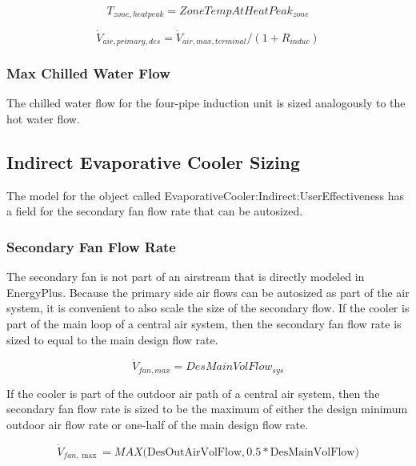 \begin{equation}
{T_{zone,heatpeak}} = ZoneTempAtHeatPea{k_{zone}}
\end{equation}

\begin{equation}
{\dot V_{air,primary,des}} = {\dot V_{air,max,terminal}}/(1 + {R_{induc}})
\end{equation}

\subsubsection{Max Chilled Water Flow}\label{max-chilled-water-flow}

The chilled water flow for the four-pipe induction unit is sized analogously to the hot water flow.

\subsection{Indirect Evaporative Cooler Sizing}\label{indirect-evaporative-cooler-sizing}

The model for the object called EvaporativeCooler:Indirect:UserEffectiveness has a field for the secondary fan flow rate that can be autosized.

\subsubsection{Secondary Fan Flow Rate}\label{secondary-fan-flow-rate}

The secondary fan is not part of an airstream that is directly modeled in EnergyPlus. Because the primary side air flows can be autosized as part of the air system, it is convenient to also scale the size of the secondary flow. If the cooler is part of the main loop of a central air system, then the secondary fan flow rate is sized to equal to the main design flow rate.

\begin{equation}
\dot V_{fan,max} = DesMainVolFlow_{sys}
\end{equation}

If the cooler is part of the outdoor air path of a central air system, then the secondary fan flow rate is sized to be the maximum of either the design minimum outdoor air flow rate or one-half of the main design flow rate.

\begin{equation}
{\dot V_{fan,\max }} = MAX({\mathrm{DesOutAirVolFlow, 0}}{\mathrm{.5*DesMainVolFlow)}}
\end{equation}

